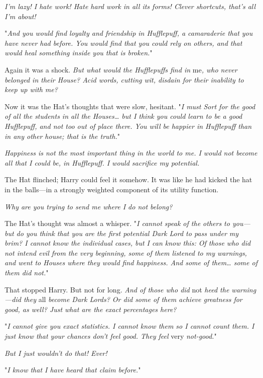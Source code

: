 \emph{I'm lazy! I hate work! Hate hard work in all its forms! Clever shortcuts, 
that's all I'm about!}

"\emph{And you would find loyalty and friendship in Hufflepuff, a camaraderie 
that you have never had before. You would find that you could rely on others, 
and that would heal something inside you that is broken.}"

Again it was a shock. \emph{But what would the Hufflepuffs find in} me\emph{, 
who never belonged in their House? Acid words, cutting wit, disdain for their 
inability to keep up with me?}

Now it was the Hat's thoughts that were slow, hesitant. "\emph{I must Sort for 
the good of all the students in all the Houses{\ldots} but I think you could 
learn to be a good Hufflepuff, and not too out of place there. You will be 
happier in Hufflepuff than in any other house; that is the truth.}"

\emph{Happiness is not the most important thing in the world to me. I would not 
become all that I could be, in Hufflepuff. I would sacrifice my potential.}

The Hat flinched; Harry could feel it somehow. It was like he had kicked the 
hat in the balls---in a strongly weighted component of its utility function.

\emph{Why are you trying to send me where I do not belong?}

The Hat's thought was almost a whisper. "\emph{I cannot speak of the others to 
you---but do you think that you are the first potential Dark Lord to pass under 
my brim? I cannot know the individual cases, but I can know this: Of those who 
did not intend evil from the very beginning, some of them listened to my 
warnings, and went to Houses where they would find happiness. And some of 
them{\ldots} some of them did not.}"

That stopped Harry. But not for long. \emph{And of those who did} not\emph{ 
heed the warning---did they} all\emph{ become Dark Lords? Or did some of them 
achieve greatness for good, as well? Just what are the exact percentages here?}

"\emph{I cannot give you exact statistics. I cannot know them so I cannot count 
them. I just know that your chances don't feel good. They feel} very\emph{ 
not-good.}"

\emph{But I just wouldn't do that! Ever!}

"\emph{I know that I have heard that claim before.}"

